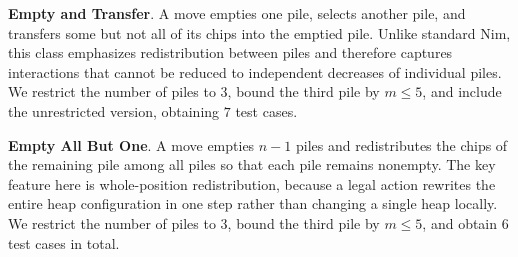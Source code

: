 \documentclass[review]{elsarticle}
\newcommand{\set}[1]{\{ #1 \}}
\newcommand{\tuple}[1]{\langle {#1} \rangle}
\newcommand{\true}{\top}
\newcommand{\statevar}{\mathcal{X}}
\newcommand{\act}{\mathcal{A}}
\newcommand{\constraint}{\mathcal{C}}
\newcommand{\estate}{\mathcal{E}}
\newcommand{\pre}{\mathtt{pre}}
\newcommand{\eff}{\mathtt{eff}}
\begin{document}
\textbf{Empty and Transfer}. A move empties one pile, selects another pile, and transfers some but not all of its chips into the emptied pile.
Unlike standard Nim, this class emphasizes redistribution between piles and therefore captures interactions that cannot be reduced to independent decreases of individual piles.
We restrict the number of piles to $3$, bound the third pile by $m \le 5$, and include the unrestricted version, obtaining $7$ test cases.

\textbf{Empty All But One}. A move empties $n-1$ piles and redistributes the chips of the remaining pile among all piles so that each pile remains nonempty.
The key feature here is whole-position redistribution, because a legal action rewrites the entire heap configuration in one step rather than changing a single heap locally.
We restrict the number of piles to $3$, bound the third pile by $m \le 5$, and obtain $6$ test cases in total.
\end{document}
